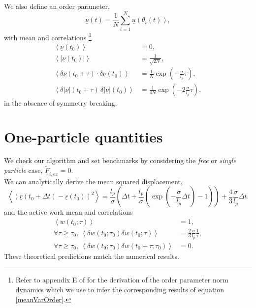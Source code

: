 \documentclass[10pt]{article}
\begin{document}
We also define an order parameter,
\begin{equation}
\underline{\nu}(t) = \frac{1}{N} \sum_{i=1}^N \underline{u}(\theta_i(t)),
\end{equation}
with mean and correlations \footnote{Refer to appendix E of \cite{nemoto_optimizing_2019} for the derivation of the order parameter norm dynamics which we use to infer the corresponding results of equation \ref{meanVarOrder}.}
\begin{equation}
\begin{aligned}
\left<\underline{\nu}(t_0)\right> &= 0,\\
\left<|\underline{\nu}(t_0)|\right> &= \frac{1}{\sqrt{2N}},\\
\left<\delta \underline{\nu}(t_0 + \tau) \cdot \delta\underline{\nu}(t_0)\right> &= \frac{1}{N} \exp\left(-\frac{\sigma}{l_p}\tau\right),\\
\left<\delta |\underline{\nu}|(t_0 + \tau) \, \delta |\underline{\nu}|(t_0)\right> &= \frac{1}{4N} \exp\left(- 2\frac{\sigma}{l_p} \tau\right),
\end{aligned}
\label{meanVarOrder}
\end{equation}
in the absence of symmetry breaking.

\section{One-particle quantities}

We check our algorithm and set benchmarks by considering the \textit{free} or \textit{single particle} case, $\tilde{\underline{F}}_{i, ex} = 0$.\\

We can analytically derive the mean squared displacement,
\begin{equation}
\left<(\underline{r}(t_0 + \Delta t) - \underline{r}(t_0))^2\right> = \frac{l_p}{\sigma}\left(\Delta t + \frac{l_p}{\sigma}\left(\exp\left(-\frac{\sigma}{l_p} \Delta t\right) - 1\right)\right) + \frac{4}{3} \frac{\sigma}{l_p} \Delta t.
\end{equation}
and the active work mean and correlations
\begin{equation}
\begin{aligned}
\left<w(t_0; \tau)\right> &= 1,\\
\forall \tau \geq \tau_0,~ \left<\delta w(t_0; \tau_0) \delta w(t_0; \tau)\right> &= \frac{2}{3} \frac{\sigma}{l_p} \frac{1}{\tau},\\
\forall \tau \geq \tau_0,~ \left<\delta w(t_0; \tau_0) \delta w(t_0 + \tau; \tau_0)\right> &= 0.
\end{aligned}
\end{equation}
These theoretical predictions match the numerical results.
\end{document}
